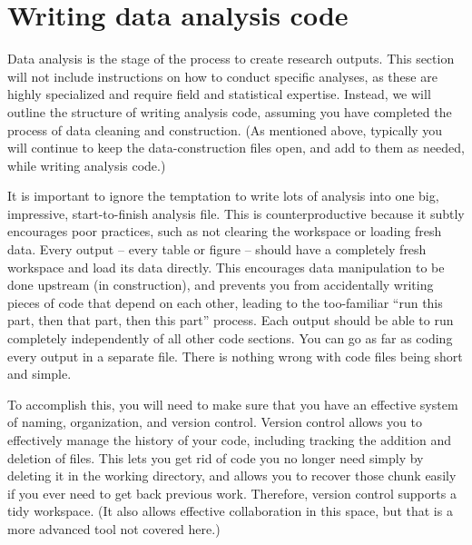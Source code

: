 
\section{Writing data analysis code}

Data analysis is the stage of the process to create research outputs.
This section will not include instructions on how to conduct specific analyses,
as these are highly specialized and require field and statistical expertise.
Instead, we will outline the structure of writing analysis code,
assuming you have completed the process of data cleaning and construction.
(As mentioned above, typically you will continue to keep
the data-construction files open, and add to them as needed,
while writing analysis code.)

It is important to ignore the temptation to write lots of analysis
into one big, impressive, start-to-finish analysis file.
This is counterproductive because it subtly encourages poor practices,
such as not clearing the workspace or loading fresh data.
Every output -- every table or figure -- should have
a completely fresh workspace and load its data directly.
This encourages data manipulation to be done upstream (in construction),
and prevents you from accidentally writing pieces of code
that depend on each other, leading to the too-familiar
``run this part, then that part, then this part'' process.
Each output should be able to run completely independently
of all other code sections.
You can go as far as coding every output in a separate file.
There is nothing wrong with code files being short and simple.

To accomplish this, you will need to make sure that you
have an effective system of naming, organization, and version control.
Version control allows you to effectively manage the history of your code,
including tracking the addition and deletion of files.
This lets you get rid of code you no longer need
simply by deleting it in the working directory,
and allows you to recover those chunk easily
if you ever need to get back previous work.
Therefore, version control supports a tidy workspace.
(It also allows effective collaboration in this space,
but that is a more advanced tool not covered here.)

